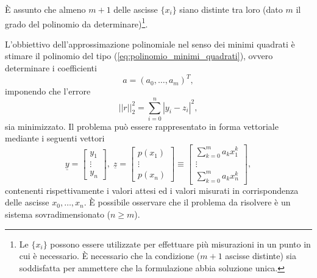 \begin{remark}\label{rem:ascisse_distinte_polinomio}
     È assunto che almeno $m+1$ delle ascisse $\{x_i\}$ siano distinte tra loro (dato $m$ il grado del polinomio da determinare)\footnote{Le $\{x_i\}$ possono essere utilizzate per effettuare più misurazioni in un punto in cui è necessario. È necessario che la condizione ($m+1$ ascisse distinte) sia soddisfatta per ammettere che la formulazione abbia soluzione unica.}.
\end{remark}

L'obbiettivo dell'approssimazione polinomiale nel senso dei minimi quadrati è stimare il polinomio del tipo (\ref{eq:polinomio_minimi_quadrati}), ovvero determinare i coefficienti 
\begin{equation*}
a = (a_0,\hdots, a_m)^T,
\end{equation*}
imponendo che l'errore
\begin{equation*}
	||r||_2^2=\sum_{i=0}^n|y_i-z_i|^2,
\end{equation*}
sia minimizzato. Il problema può essere rappresentato in forma vettoriale mediante i seguenti vettori
\begin{equation}
    \underline{y}=
    \begin{bmatrix}
        y_1\\
        \vdots\\
        y_n
    \end{bmatrix},\;
    \underline{z}=
    \begin{bmatrix}
        p(x_1)\\
        \vdots\\
        p(x_n)
    \end{bmatrix}
    \equiv
    \begin{bmatrix}
        \sum_{k=0}^m a_kx_1^k\\
        \vdots\\
        \sum_{k=0}^m a_kx_n^k
    \end{bmatrix},
\end{equation}
contenenti rispettivamente i valori attesi ed i valori misurati in corrispondenza delle ascisse $x_0,\hdots,x_n$. È possibile osservare che il problema da risolvere è un sistema sovradimensionato ($n\geq m$).


